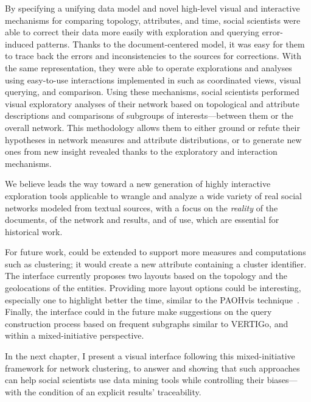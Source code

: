 By specifying a unifying data model and novel high-level visual and interactive mechanisms for comparing topology, attributes, and time, social scientists were able to correct their data more easily with exploration and querying error-induced patterns.
Thanks to the document-centered model, it was easy for them to trace back the errors and inconsistencies to the sources for corrections.
With the same representation, they were able to operate explorations and analyses using easy-to-use interactions implemented in \name such as coordinated views, visual querying, and comparison.
Using these mechanisms, social scientists performed visual exploratory analyses of their network based on topological and attribute descriptions and comparisons of subgroups of interests---between them or the overall network.
This methodology allows them to either ground or refute their hypotheses in network measures and attribute distributions, or to generate new ones from new insight revealed thanks to the exploratory and interaction mechanisms.

We believe \name leads the way toward a new generation of highly interactive exploration tools applicable to wrangle and analyze a wide variety of real social networks modeled from textual sources, with a focus on the \textsl{reality} of the documents, \traceability of the network and results,  and \simplicity of use, which are essential for historical work.

For future work, \name could be extended to support more \sna measures and computations such as clustering; it would create a new attribute containing a cluster identifier.
The interface currently proposes two layouts based on the topology and the geolocations of the entities.
Providing more layout options could be interesting, especially one to highlight better the time, similar to the PAOHvis technique~\cite{valdiviaAnalyzingDynamicHypergraphs2021}.
Finally, the interface could in the future make suggestions on the query construction process based on frequent subgraphs similar to VERTIGo\cite{cuencaVERTIGoVisualPlatform2021}, and within a mixed-initiative perspective\cite{makoninMixedInitiativeBigData2016}.

In the next chapter, I present a visual interface following this mixed-initiative framework for network clustering, to answer \qthree and showing that such approaches can help social scientists use data mining tools while controlling their biases---with the condition of an explicit results' traceability.



